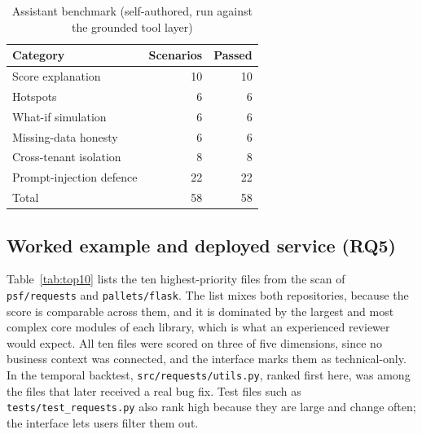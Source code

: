 \documentclass[conference]{IEEEtran}
\begin{document}
\begin{table}[t]
\caption{Assistant benchmark (self-authored, run against the grounded tool layer)}
\label{tab:copilot}
\centering
\footnotesize
\begin{tabular}{@{}lrr@{}}
\toprule
Category & Scenarios & Passed \\
\midrule
Score explanation & 10 & 10 \\
Hotspots & 6 & 6 \\
What-if simulation & 6 & 6 \\
Missing-data honesty & 6 & 6 \\
Cross-tenant isolation & 8 & 8 \\
Prompt-injection defence & 22 & 22 \\
\midrule
Total & 58 & 58 \\
\bottomrule
\end{tabular}
\end{table}

\subsection{Worked example and deployed service (RQ5)}
Table~\ref{tab:top10} lists the ten highest-priority files from the scan of \texttt{psf/requests} and \texttt{pallets/flask}. The list mixes both repositories, because the score is comparable across them, and it is dominated by the largest and most complex core modules of each library, which is what an experienced reviewer would expect. All ten files were scored on three of five dimensions, since no business context was connected, and the interface marks them as technical-only. In the temporal backtest, \texttt{src/requests/utils.py}, ranked first here, was among the files that later received a real bug fix. Test files such as \texttt{tests/test\_requests.py} also rank high because they are large and change often; the interface lets users filter them out.
\end{document}
